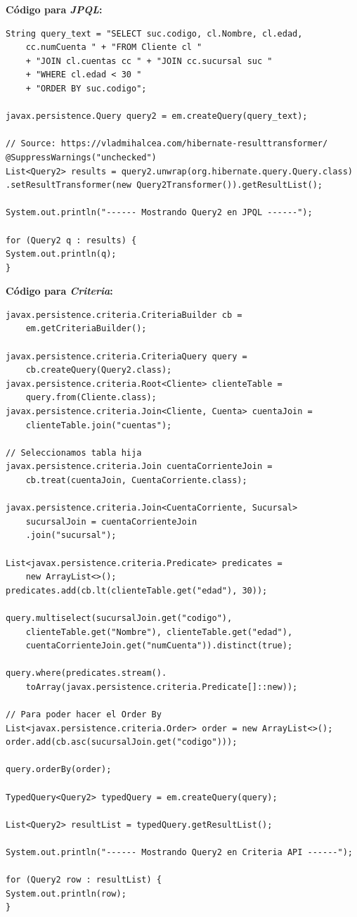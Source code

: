 \documentclass[11pt,a4paper]{article}
\begin{document}
\bigbreak
\textbf{Código para \textit{JPQL}:}
\begin{lstlisting}
String query_text = "SELECT suc.codigo, cl.Nombre, cl.edad, 
	cc.numCuenta " + "FROM Cliente cl "
	+ "JOIN cl.cuentas cc " + "JOIN cc.sucursal suc " 
	+ "WHERE cl.edad < 30 "
	+ "ORDER BY suc.codigo";

javax.persistence.Query query2 = em.createQuery(query_text);

// Source: https://vladmihalcea.com/hibernate-resulttransformer/
@SuppressWarnings("unchecked")
List<Query2> results = query2.unwrap(org.hibernate.query.Query.class)
.setResultTransformer(new Query2Transformer()).getResultList();

System.out.println("------ Mostrando Query2 en JPQL ------");

for (Query2 q : results) {
System.out.println(q);
}
\end{lstlisting}

\bigbreak
\textbf{Código para \textit{Criteria}:}
\begin{lstlisting}
javax.persistence.criteria.CriteriaBuilder cb = 
	em.getCriteriaBuilder();

javax.persistence.criteria.CriteriaQuery query = 
	cb.createQuery(Query2.class);
javax.persistence.criteria.Root<Cliente> clienteTable = 
	query.from(Cliente.class);
javax.persistence.criteria.Join<Cliente, Cuenta> cuentaJoin = 
	clienteTable.join("cuentas");

// Seleccionamos tabla hija
javax.persistence.criteria.Join cuentaCorrienteJoin = 
	cb.treat(cuentaJoin, CuentaCorriente.class);

javax.persistence.criteria.Join<CuentaCorriente, Sucursal> 
	sucursalJoin = cuentaCorrienteJoin
	.join("sucursal");

List<javax.persistence.criteria.Predicate> predicates = 
	new ArrayList<>();
predicates.add(cb.lt(clienteTable.get("edad"), 30));

query.multiselect(sucursalJoin.get("codigo"), 
	clienteTable.get("Nombre"), clienteTable.get("edad"),
	cuentaCorrienteJoin.get("numCuenta")).distinct(true);

query.where(predicates.stream().
	toArray(javax.persistence.criteria.Predicate[]::new));

// Para poder hacer el Order By
List<javax.persistence.criteria.Order> order = new ArrayList<>();
order.add(cb.asc(sucursalJoin.get("codigo")));

query.orderBy(order);

TypedQuery<Query2> typedQuery = em.createQuery(query);

List<Query2> resultList = typedQuery.getResultList();

System.out.println("------ Mostrando Query2 en Criteria API ------");

for (Query2 row : resultList) {
System.out.println(row);
}
\end{lstlisting}
\end{document}
